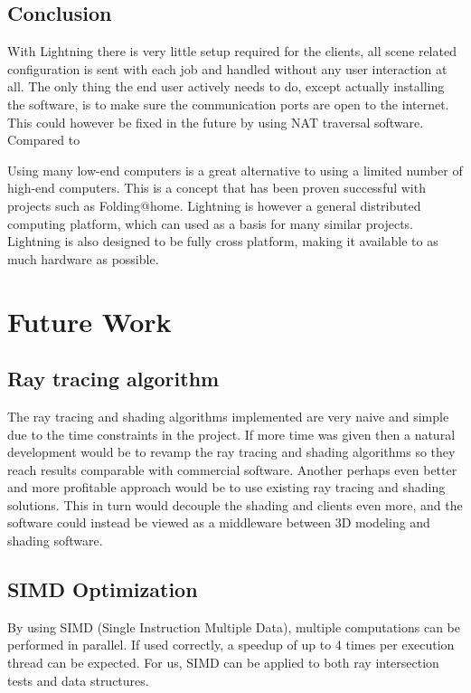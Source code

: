 \section{Conclusion}

With Lightning there is very little setup required for the clients, all scene related configuration is sent with each job and handled without any user interaction at all. The only thing the end user actively needs to do, except actually installing the software, is to make sure the communication ports are open to the internet. This could however be fixed in the future by using NAT traversal software.
Compared to 

Using many low-end computers is a great alternative to using a limited number of high-end computers. This is a concept that has been proven successful with projects such as Folding@home. Lightning is however a general distributed computing platform, which can used as a basis for many similar projects. Lightning is also designed to be fully cross platform, making it available to as much hardware as possible.




\chapter{Future Work}
\section{Ray tracing algorithm}
The ray tracing and shading algorithms implemented are very naive and simple due to the time constraints in the project. If more time was given then a natural development would be to revamp the ray tracing and shading algorithms so they reach results comparable with commercial software. Another perhaps even better and more profitable approach would be to use existing ray tracing and shading solutions. This in turn would decouple the shading and clients even more, and the software could instead be viewed as a middleware between 3D modeling and shading software.

\section{SIMD Optimization}
By using SIMD (Single Instruction Multiple Data), multiple computations can be performed in parallel. If used correctly, a speedup of up to 4 times per execution thread can be expected. For us, SIMD can be applied to both ray intersection tests and data structures.

